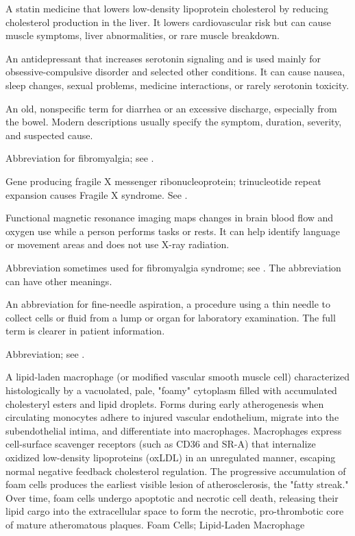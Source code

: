  A statin medicine that lowers low-density lipoprotein cholesterol by reducing cholesterol production in the liver. It lowers cardiovascular risk but can cause muscle symptoms, liver abnormalities, or rare muscle breakdown.

 An antidepressant that increases serotonin signaling and is used mainly for obsessive-compulsive disorder and selected other conditions. It can cause nausea, sleep changes, sexual problems, medicine interactions, or rarely serotonin toxicity.

 An old, nonspecific term for diarrhea or an excessive discharge, especially from the bowel. Modern descriptions usually specify the symptom, duration, severity, and suspected cause.

 Abbreviation for fibromyalgia; see .

 Gene producing fragile X messenger ribonucleoprotein; trinucleotide repeat expansion causes Fragile X syndrome. See .

 Functional magnetic resonance imaging maps changes in brain blood flow and oxygen use while a person performs tasks or rests. It can help identify language or movement areas and does not use X-ray radiation.

 Abbreviation sometimes used for fibromyalgia syndrome; see
. The abbreviation can have other meanings.

 An abbreviation for fine-needle aspiration, a procedure using a thin needle to collect cells or fluid from a lump or organ for laboratory examination. The full term is clearer in patient information.

 Abbreviation; see .

 A lipid-laden macrophage (or modified vascular smooth muscle cell) characterized histologically by a vacuolated, pale, "foamy" cytoplasm filled with accumulated cholesteryl esters and lipid droplets. Forms during early atherogenesis when circulating monocytes adhere to injured vascular endothelium, migrate into the subendothelial intima, and differentiate into macrophages. Macrophages express cell-surface scavenger receptors (such as CD36 and SR-A) that internalize oxidized low-density lipoproteins (oxLDL) in an unregulated manner, escaping normal negative feedback cholesterol regulation. The progressive accumulation of foam cells produces the earliest visible lesion of atherosclerosis, the "fatty streak." Over time, foam cells undergo apoptotic and necrotic cell death, releasing their lipid cargo into the extracellular space to form the necrotic, pro-thrombotic core of mature atheromatous plaques.
\synonyms
Foam Cells; Lipid-Laden Macrophage

